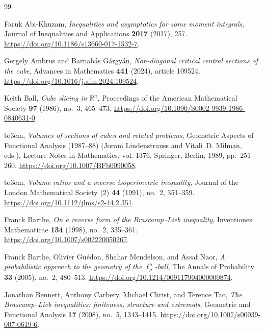 \documentclass[11pt,a4paper]{article}
\theoremstyle{remark}\newtheorem{remark}[theorem]{Remark}
\numberwithin{equation}{section}
\begin{document}
\providecommand{\bysame}{\leavevmode\hbox to3em{\hrulefill}\thinspace}
\providecommand{\MR}{\relax\ifhmode\unskip\space\fi MR }
\providecommand{\MRhref}[2]{%
  \href{http://www.ams.org/mathscinet-getitem?mr=#1}{#2}
}
\providecommand{\href}[2]{#2}
\begin{thebibliography}{99}
\setlength{\itemsep}{2pt plus 1pt minus 1pt}
\setlength{\parsep}{0pt}

Faruk Abi-Khuzam, \emph{Inequalities and asymptotics for some moment
  integrals}, Journal of Inequalities and Applications \textbf{2017} (2017),
  257.
\newblock \url{https://doi.org/10.1186/s13660-017-1532-7}.

Gergely Ambrus and Barnab\'as G\'argy\'an, \emph{Non-diagonal critical central sections of the cube},
Advances in Mathematics \textbf{441} (2024), article 109524.
\newblock \url{https://doi.org/10.1016/j.aim.2024.109524}.

Keith Ball, \emph{Cube slicing in {$\mathbb R^n$}}, Proceedings of the American
  Mathematical Society \textbf{97} (1986), no.~3, 465--473.
\newblock \url{https://doi.org/10.1090/S0002-9939-1986-0840631-0}.

\bysame, \emph{Volumes of sections of cubes and related problems}, Geometric
  Aspects of Functional Analysis (1987--88) (Joram Lindenstrauss and Vitali~D.
  Milman, eds.), Lecture Notes in Mathematics, vol. 1376, Springer, Berlin,
  1989, pp.~251--260.
\newblock \url{https://doi.org/10.1007/BFb0090058}.

\bysame, \emph{Volume ratios and a reverse isoperimetric inequality},
Journal of the London Mathematical Society (2) \textbf{44} (1991), no.~2, 351--359.
\newblock \url{https://doi.org/10.1112/jlms/s2-44.2.351}.

Franck Barthe, \emph{On a reverse form of the {Brascamp--Lieb} inequality},
  Inventiones Mathematicae \textbf{134} (1998), no.~2, 335--361.
\newblock \url{https://doi.org/10.1007/s002220050267}.

Franck Barthe, Olivier Gu\'edon, Shahar Mendelson, and Assaf Naor, \emph{A
  probabilistic approach to the geometry of the {$\ell_p^n$}-ball}, The Annals
  of Probability \textbf{33} (2005), no.~2, 480--513.
\newblock \url{https://doi.org/10.1214/009117904000000874}.

Jonathan Bennett, Anthony Carbery, Michael Christ, and Terence Tao, \emph{The
  {Brascamp--Lieb} inequalities: finiteness, structure and extremals},
  Geometric and Functional Analysis \textbf{17} (2008), no.~5, 1343--1415.
\newblock \url{https://doi.org/10.1007/s00039-007-0619-6}.


\end{thebibliography}
\end{document}
